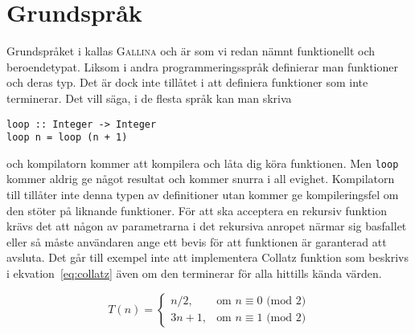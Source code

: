\section{Grundspråk}
Grundspråket i \coq{} kallas \textsc{Gallina} och är som vi redan nämnt
funktionellt och beroendetypat. Liksom i andra programmeringsspråk definierar
man funktioner och deras typ. Det är dock inte tillåtet i \coq{} att definiera
funktioner som inte terminerar. Det vill säga, i de flesta språk kan man skriva
\begin{verbatim}
loop :: Integer -> Integer
loop n = loop (n + 1)
\end{verbatim}
och kompilatorn kommer att kompilera och låta dig köra funktionen. Men
\verb+loop+ kommer aldrig ge något resultat och kommer snurra i all evighet.
Kompilatorn till \coq{} tillåter inte denna typen av definitioner utan kommer
ge kompileringsfel om den stöter på liknande funktioner. För att \coq{} ska
acceptera en rekursiv funktion krävs det att någon av parametrarna i det
rekursiva anropet närmar sig basfallet eller så måste användaren ange ett bevis
för att funktionen är garanterad att avsluta. Det går till exempel inte att
implementera Collatz funktion som beskrivs i ekvation~\ref{eq:collatz} även om
den terminerar för alla hittills kända värden.

\begin{equation}
\label{eq:collatz}
T(n) = \left\{\begin{matrix} n/2, & \mbox{om }n\equiv0\mbox{ (mod 2)} \\ 3n+1,
                         & \mbox{om }n\equiv1\mbox{ (mod 2)} \end{matrix}\right.
\end{equation}

